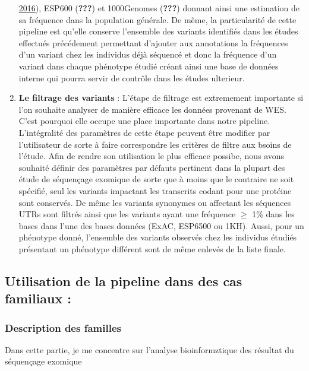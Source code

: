\documentclass[12pt,twoside]{reedthesis}
\theoremstyle{definition}
\theoremstyle{definition}
\theoremstyle{remark}
\begin{document}
\begin{enumerate}
    \protect\hyperlink{ref-Lek2016}{2016}), ESP600 ({\textbf{???}}) et
    1000Genomes ({\textbf{???}}) donnant ainsi une estimation de sa
    fréquence dans la population générale. De même, la particularité de
    cette pipeline est qu'elle conserve l'ensemble des variants identifiés
    dans les études effectués précédement permettant d'ajouter aux
    annotations la fréquences d'un variant chez les individus déjà
    séquencé et donc la fréquence d'un variant dans chaque phénotype
    étudié créant ainsi une base de données interne qui pourra servir de
    contrôle dans les études ulterieur.
  \item
    \textbf{Le filtrage des variants} : L'étape de filtrage est
    extremement importante si l'on souhaite analyser de manière efficace
    les données provenant de WES. C'est pourquoi elle occupe une place
    importante dans notre pipeline. L'intégralité des paramètres de cette
    étape peuvent être modifier par l'utilisateur de sorte à faire
    correspondre les critères de filtre aux bsoins de l'étude. Afin de
    rendre son utilisation le plus efficace possibe, nous avons souhaité
    définir des paramètres par défauts pertinent dans la plupart des étude
    de séquençage exomique de sorte que à moins que le contraire ne soit
    spécifié, seul les variants impactant les transcrits codant pour une
    protéine sont conservés. De même les variants synonymes ou affectant
    les séquences UTRs sont filtrés ainsi que les variants ayant une
    fréquence \(\ge\) 1\% dans les bases dans l'une des bases données
    (ExAC, ESP6500 ou 1KH). Aussi, pour un phénotype donné, l'ensemble des
    variants observés chez les individus étudiés présentant un phénotype
    différent sont de même enlevés de la liste finale.
  \end{enumerate}
  
  \subsection{Utilisation de la pipeline dans des cas familiaux
  :}\label{utilisation-de-la-pipeline-dans-des-cas-familiaux}
  
  \subsubsection{Description des familles}\label{description-des-familles}
  
  Dans cette partie, je me concentre sur l'analyse bioinformztique des
  résultat du séquençage exomique
  
\end{document}

